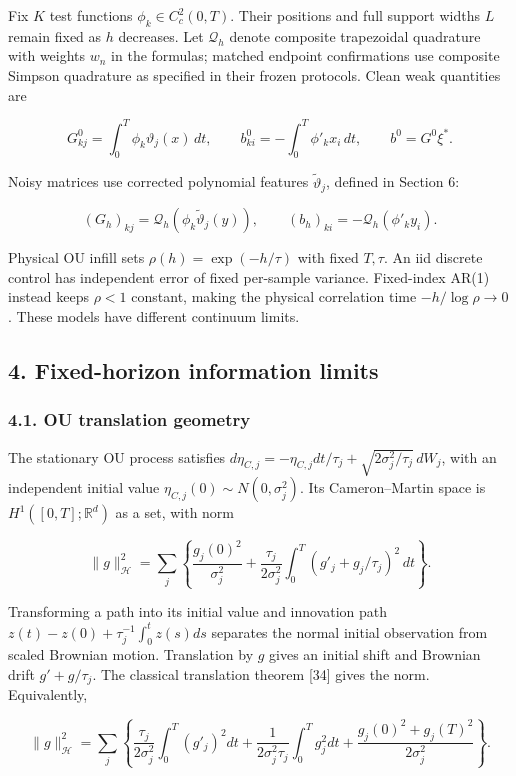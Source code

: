 \documentclass[
  american,
  11pt,
]{article}
\begin{document}
Fix \(K\) test functions \(\phi_k\in C_c^2(0,T)\). Their positions and
full support widths \(L\) remain fixed as \(h\) decreases. Let
\(\mathcal Q_h\) denote composite trapezoidal quadrature with weights
\(w_n\) in the formulas; matched endpoint confirmations use composite
Simpson quadrature as specified in their frozen protocols. Clean weak
quantities are

\[
G^0_{kj}=\int_0^T\phi_k\vartheta_j(x)\,dt,\qquad
b^0_{ki}=-\int_0^T\phi'_kx_i\,dt,\qquad b^0=G^0\xi^*.
\]

Noisy matrices use corrected polynomial features
\(\widetilde\vartheta_j\), defined in Section 6:

\[
(G_h)_{kj}=\mathcal Q_h(\phi_k\widetilde\vartheta_j(y)),\qquad
(b_h)_{ki}=-\mathcal Q_h(\phi'_ky_i).
\]

Physical OU infill sets \(\rho(h)=\exp(-h/\tau)\) with fixed \(T,\tau\).
An iid discrete control has independent error of fixed per-sample
variance. Fixed-index AR(1) instead keeps \(\rho<1\) constant, making
the physical correlation time \(-h/\log\rho\to0\). These models have
different continuum limits.

\subsection{4. Fixed-horizon information
limits}\label{fixed-horizon-information-limits}

\subsubsection{4.1. OU translation
geometry}\label{ou-translation-geometry}

The stationary OU process satisfies
\(d\eta_{C,j}=-\eta_{C,j}dt/\tau_j+\sqrt{2\sigma_j^2/\tau_j}\,dW_j\),
with an independent initial value \(\eta_{C,j}(0)\sim N(0,\sigma_j^2)\).
Its Cameron--Martin space is \(H^1([0,T];\mathbb R^d)\) as a set, with
norm

\[
\|g\|_{\mathcal H}^2=\sum_j\left\{\frac{g_j(0)^2}{\sigma_j^2}+
\frac{\tau_j}{2\sigma_j^2}\int_0^T(g'_j+g_j/\tau_j)^2\,dt\right\}.
\]

Transforming a path into its initial value and innovation path
\(z(t)-z(0)+\tau_j^{-1}\int_0^tz(s)ds\) separates the normal initial
observation from scaled Brownian motion. Translation by \(g\) gives an
initial shift and Brownian drift \(g'+g/\tau_j\). The classical
translation theorem {[}34{]} gives the norm. Equivalently,

\[
\|g\|_{\mathcal H}^2=\sum_j\left\{\frac{\tau_j}{2\sigma_j^2}\int_0^T(g'_j)^2dt+
\frac1{2\sigma_j^2\tau_j}\int_0^Tg_j^2dt+
\frac{g_j(0)^2+g_j(T)^2}{2\sigma_j^2}\right\}.
\]
\end{document}
